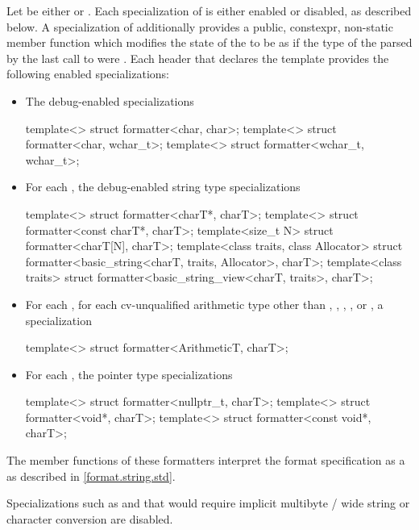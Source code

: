 \pnum
Let  be either  or .
Each specialization of  is either enabled or disabled,
as described below.
%
A  specialization of 
additionally provides
a public, constexpr, non-static member function 
which modifies the state of the  to be as if
the type of the 
parsed by the last call to  were .
Each header that declares the template 
provides the following enabled specializations:
\begin{itemize}
\item
{}%
The debug-enabled specializations
\begin{codeblock}
template<> struct formatter<char, char>;
template<> struct formatter<char, wchar_t>;
template<> struct formatter<wchar_t, wchar_t>;
\end{codeblock}

\item
{}%
For each ,
the debug-enabled string type specializations
\begin{codeblock}
template<> struct formatter<charT*, charT>;
template<> struct formatter<const charT*, charT>;
template<size_t N> struct formatter<charT[N], charT>;
template<class traits, class Allocator>
  struct formatter<basic_string<charT, traits, Allocator>, charT>;
template<class traits>
  struct formatter<basic_string_view<charT, traits>, charT>;
\end{codeblock}

\item
{}%
For each ,
for each cv-unqualified arithmetic type 
other than
,
,
,
, or
,
a specialization
\begin{codeblock}
template<> struct formatter<ArithmeticT, charT>;
\end{codeblock}

\item
{}%
%
For each ,
the pointer type specializations
\begin{codeblock}
template<> struct formatter<nullptr_t, charT>;
template<> struct formatter<void*, charT>;
template<> struct formatter<const void*, charT>;
\end{codeblock}
\end{itemize}
The  member functions of these formatters
interpret the format specification
as a 
as described in \ref{format.string.std}.
\begin{note}
Specializations such as 
and 
that would require implicit
multibyte / wide string or character conversion are disabled.
\end{note}

